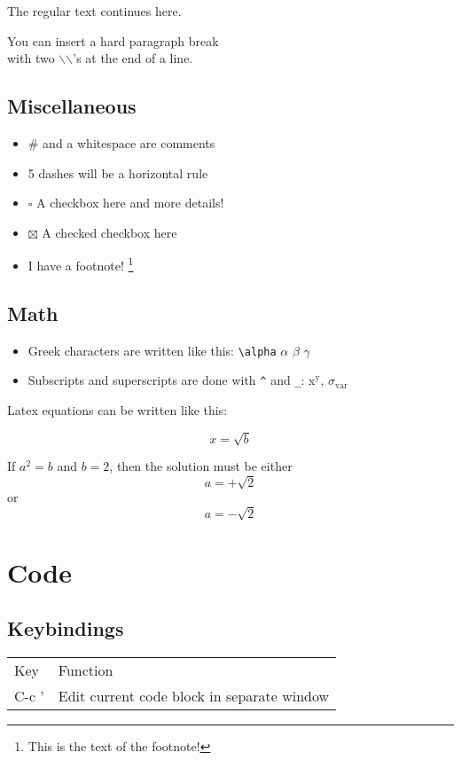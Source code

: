 \documentclass[11pt]{article}
\begin{document}
The regular text continues here. 

You can insert a hard paragraph break\\
 with two \emph{$\backslash$}$\backslash$'s at the end of a line.

\subsection{Miscellaneous}
\label{sec-1-3}

\begin{itemize}
\item \# and a whitespace are comments
\item 5 dashes will be a horizontal rule
\item $\square$ A checkbox here and more details!
\item $\boxtimes$ A checked checkbox here
\item I have a footnote! \footnote{This is the text of the footnote!}
\end{itemize}

\subsection{Math}
\label{sec-1-4}
\begin{itemize}
\item Greek characters are written like this: \verb~\alpha~ $\alpha$ $\beta$ $\gamma$
\item Subscripts and superscripts are done with \verb~^~ and \verb~_~: x$^{\text{y}}$, $\sigma$$_{\text{var}}$
\end{itemize}

Latex equations can be written like this:

\begin{equation}
x=\sqrt{b}
\end{equation}

If $a^2=b$ and \( b=2 \), then the solution must be
either $$ a=+\sqrt{2} $$ or \[ a=-\sqrt{2} \]


\section{Code}
\label{sec-2}

\subsection{Keybindings}
\label{sec-2-1}
\begin{center}
\begin{tabular}{ll}
Key & Function\\
C-c ' & Edit current code block in separate window\\
\end{tabular}
\end{center}
\end{document}
